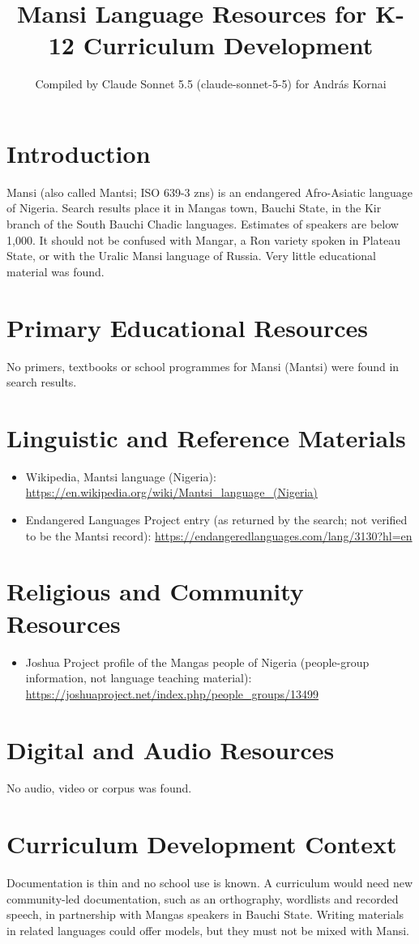 \documentclass[12pt]{article}
\title{Mansi Language Resources for K-12 Curriculum Development}
\author{Compiled by Claude Sonnet 5.5 (claude-sonnet-5-5) for Andr\'as Kornai}
\date{}
\begin{document}
\maketitle

\section{Introduction}
Mansi (also called Mantsi; ISO 639-3 zns) is an endangered Afro-Asiatic language of Nigeria. Search results place it in Mangas town, Bauchi State, in the Kir branch of the South Bauchi Chadic languages. Estimates of speakers are below 1,000. It should not be confused with Mangar, a Ron variety spoken in Plateau State, or with the Uralic Mansi language of Russia. Very little educational material was found.

\section{Primary Educational Resources}
No primers, textbooks or school programmes for Mansi (Mantsi) were found in search results.

\section{Linguistic and Reference Materials}
\begin{itemize}
\item Wikipedia, Mantsi language (Nigeria): \url{https://en.wikipedia.org/wiki/Mantsi_language_(Nigeria)}
\item Endangered Languages Project entry (as returned by the search; not verified to be the Mantsi record): \url{https://endangeredlanguages.com/lang/3130?hl=en}
\end{itemize}

\section{Religious and Community Resources}
\begin{itemize}
\item Joshua Project profile of the Mangas people of Nigeria (people-group information, not language teaching material): \url{https://joshuaproject.net/index.php/people_groups/13499}
\end{itemize}

\section{Digital and Audio Resources}
No audio, video or corpus was found.

\section{Curriculum Development Context}
Documentation is thin and no school use is known. A curriculum would need new community-led documentation, such as an orthography, wordlists and recorded speech, in partnership with Mangas speakers in Bauchi State. Writing materials in related languages could offer models, but they must not be mixed with Mansi.
\end{document}
